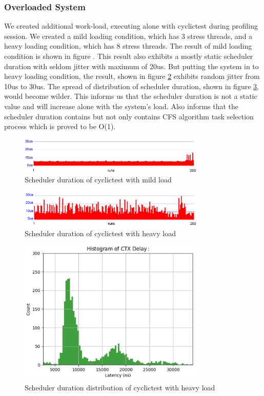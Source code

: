 \documentclass[conference]{IEEEtran}
\begin{document}
\subsubsection{Overloaded System}

    We created additional work-load, executing alone with cyclictest during profiling session. We created a mild loading
    condition, which has 3 stress threads, and a heavy loading condition, which has 8 stress threads. The result of mild
    loading condition is shown in figure \label{fig:sd_mild}. This result also exhibits a mostly static scheduler
    duration with seldom jitter with maximum of 20us. But putting the system in to heavy loading condition, the result,
    shown in figure \ref{fig:sd_heavy} exhibits random jitter from 10us to 30us. The spread of distribution of scheduler
    duration, shown in figure \ref{fig:sd_heavy_d}, would become wilder. This informs us that the scheduler duration is
    not a static value and will increase alone with the system's load. Also informs that the scheduler duration contains
    but not only contains CFS algorithm task selection process which is proved to be O(1).

    \begin{figure} \centering \includegraphics[width=3.5in]{img/sd-mild.png} \caption{Scheduler duration of cyclictest
    with mild load} \label{fig:sd_mild} \end{figure}

    \begin{figure} \centering \includegraphics[width=3.5in]{img/sd-heavy.png} \caption{Scheduler duration of cyclictest
    with heavy load} \label{fig:sd_heavy} \end{figure}

    \begin{figure} \centering \includegraphics[width=3.5in]{img/sd-heavy-d.png} \caption{Scheduler duration distribution
    of cyclictest with heavy load} \label{fig:sd_heavy_d} \end{figure}
\end{document}
